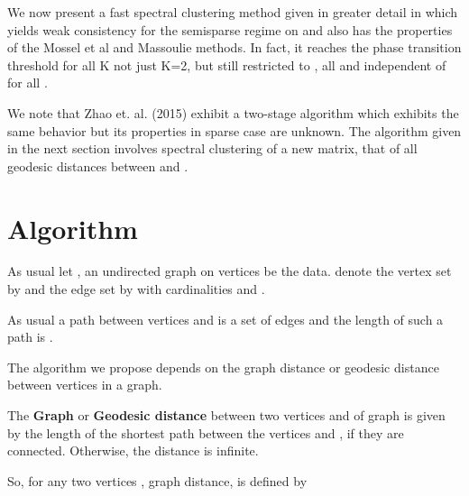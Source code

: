 \documentclass[graybox]{svmult}
\begin{document}
We now present a fast spectral clustering method given in greater detail in \cite{bhattacharyya2014community} which yields weak consistency  for the semisparse regime on and also has the properties of  the Mossel et al and Massoulie methods. In fact, it reaches the phase transition threshold  for all K not just K=2, but still restricted to , all  and   independent of  for all . 

We note that Zhao et. al. (2015) \cite{gao2015achieving} exhibit a two-stage algorithm which exhibits the same behavior but its properties in sparse case are unknown. The algorithm given in the next section involves spectral clustering of a new matrix, that of all geodesic distances between  and . 



\section{Algorithm}
\label{sec_prel}
As usual let , an undirected graph on  vertices be the data. denote the vertex set by  and the edge set by  with cardinalities  and .







As usual a path between vertices  and  is a set of edges  and the length of such a path is .

The algorithm we propose depends on the graph distance or geodesic distance between vertices in a graph.
\begin{definition}
\label{def_geo_dis}
The \textbf{Graph} or \textbf{Geodesic distance} between two vertices  and  of graph  is given by the length of the shortest path between the vertices  and , if they are connected. Otherwise, the distance is infinite.
\end{definition}
So, for any two vertices , graph distance,  is defined by
\end{document}
